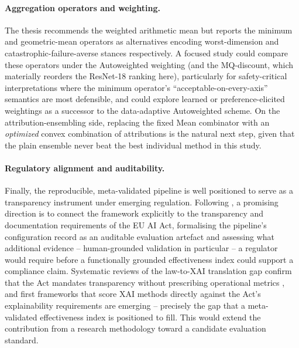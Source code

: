 \paragraph{Aggregation operators and weighting.}
The thesis recommends the weighted arithmetic mean but reports the minimum and
geometric-mean operators as alternatives encoding worst-dimension and
catastrophic-failure-averse stances respectively. A focused study could compare
these operators under the Autoweighted weighting (and the MQ-discount, which
materially reorders the ResNet-18 ranking here), particularly for
safety-critical interpretations where the minimum operator's
``acceptable-on-every-axis'' semantics are most defensible, and could explore
learned or preference-elicited weightings as a successor to the data-adaptive
Autoweighted scheme. On the attribution-ensembling side, replacing the fixed
Mean combinator with an \emph{optimized} convex combination of attributions
\citep{decker2024provably} is the natural next step, given that the plain
ensemble never beat the best individual method in this study.

\paragraph{Regulatory alignment and auditability.}
Finally, the reproducible, meta-validated pipeline is well positioned to serve
as a transparency instrument under emerging regulation. Following
\citet{seth2025bridging}, a promising direction is to connect the framework
explicitly to the transparency and documentation requirements of the EU AI Act,
formalising the pipeline's configuration record as an auditable evaluation
artefact and assessing what additional evidence -- human-grounded validation in
particular -- a regulator would require before a functionally grounded
effectiveness index could support a compliance claim. Systematic reviews of
the law-to-XAI translation gap confirm that the Act mandates transparency
without prescribing operational metrics \citep{fresz2026gap}, and first
frameworks that score XAI methods directly against the Act's explainability
requirements are emerging \citep{sovrano2026assessing} -- precisely the
gap that a meta-validated effectiveness index is positioned to fill. This
would extend the
contribution from a research methodology toward a candidate evaluation standard.
